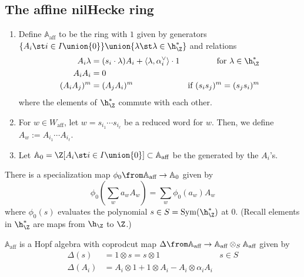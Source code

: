 \documentclass[11pt,leqno,oneside]{amsart}
\numberwithin{thm}{section}
\renewcommand{\W}{W}
\newcommand{\Waff}{\W_{\text{aff}}}
\newcommand{\A}{\mathbb{A}}
\newcommand{\Aaff}{\A_{\text{aff}}}
\begin{document}
\subsection{The affine nilHecke ring}
\begin{defn}
  \begin{enumerate}
  \item Define \(\Aaff\) to be the ring with \(1\) given by generators
    \(\{A_i \st i \in I \union \{0\}\} \union \{\lambda \st \lambda
    \in \h_\Z^*\}\) and relations
    \begin{align*}
      A_i \lambda
      & = (s_i \cdot \lambda) A_i + \langle \lambda,
        \alpha_i^\vee \rangle \cdot 1 & \text{for }\lambda \in \h_\Z^*\\
      A_i A_i & = 0 \\
      (A_i A_j)^m & = (A_jA_i)^m & \text{if }(s_i s_j)^m = (s_j s_i)^m
    \end{align*}
    where the elements of \(\h_\Z^*\) commute with each other.
  \item For \(w \in \Waff\), let \(w = s_{i_1} \cdots s_{i_\ell}\) be
    a reduced word for \(w\). Then, we define \(A_w := A_{i_1} \cdots A_{i_\ell}\).
  \item Let \(\A_0 = \Z[A_i \st i \in I \union \{0\}] \subset \Aaff\)
    be the  generated by the \(A_i\)'s.
  \end{enumerate}
\end{defn}
There is a specialization map \(\phi_0 \from \Aaff \to \A_0\) given
by \[
  \phi_0\left( \sum_{w} a_w A_w\right) = \sum_w \phi_0(a_w) A_w
\]
where \(\phi_0(s)\) evaluates the polynomial \(s \in S =
\operatorname{Sym}(\h_\Z^*)\) at \(0\). (Recall elements in
\(\h_\Z^*\) are maps from \(\h_\Z\) to \(\Z\).)
\begin{prop}
  \(\Aaff\) is a Hopf algebra with coprodcut map \(\Delta \from \Aaff
  \to \Aaff \otimes_S \Aaff\) given by
  \begin{align*}
    \Delta(s) & = 1 \otimes s = s \otimes 1 & s \in S\\
    \Delta(A_i) & = A_i \otimes 1 + 1 \otimes A_i - A_i \otimes \alpha_i A_i
  \end{align*}
\end{prop}
\end{document}
